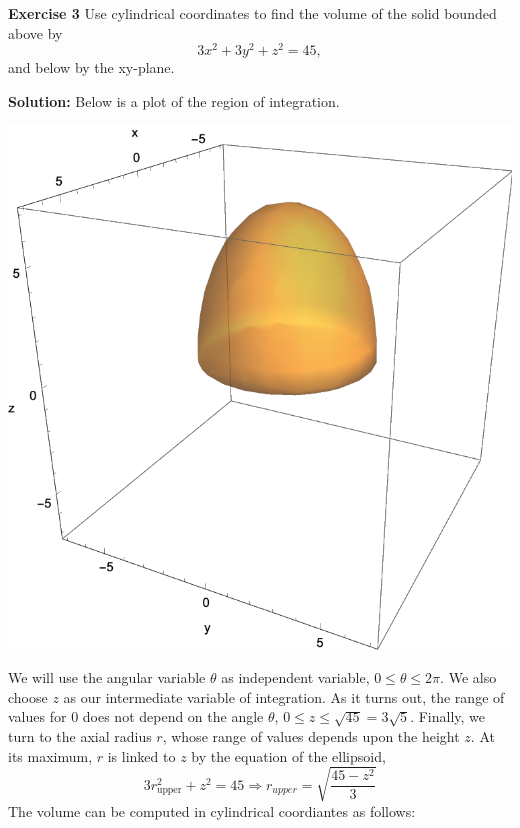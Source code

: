 \documentclass[12pt,oneside]{exam}
\newenvironment{exercise}[1]{\vspace{.1in}\noindent\textbf{Exercise #1 \hspace{.05em}}}{}
\newenvironment{newsolution}{\vspace{.1in}\noindent\textbf{Solution: \hspace{.05em}}}{}
\begin{document}
\begin{exercise}{3}
Use cylindrical coordinates to find the volume of the solid bounded above by 
\begin{equation*}
3x^2+3y^2+z^2 = 45,
\end{equation*}
and below by the xy-plane.
\end{exercise}

\begin{newsolution}
Below is a plot of the region of integration.
\begin{center}
\includegraphics[scale=0.5]{p10.pdf}
\end{center}
We will use the angular variable $\theta$ as independent variable, $0 \leq \theta \leq 2\pi$. We also choose $z$ as our intermediate variable of integration. As it turns out, the range of values for $0$ does not depend on the angle $\theta$, $0 \leq z \leq \sqrt{45}=3\sqrt{5}$. Finally, we turn to the axial radius $r$, whose range of values depends upon the height $z$. At its maximum, $r$ is linked to $z$ by the equation of the ellipsoid, 
\begin{equation*}
3r_{\mathrm{upper}}^{2} +z^2 =45 \Rightarrow r_{upper} = \sqrt{\frac{45-z^2}{3}}
\end{equation*}
The volume can be computed in cylindrical coordiantes as follows:

\end{newsolution}
\end{document}
